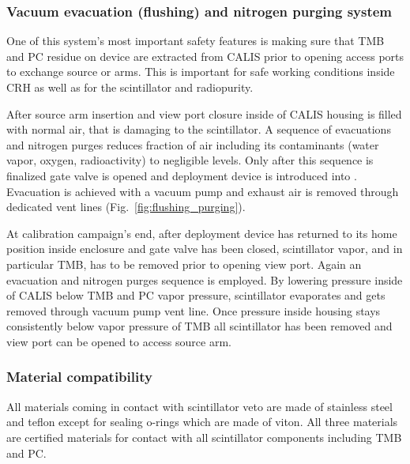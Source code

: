 \subsubsection*{Vacuum evacuation (flushing) and nitrogen purging system}\label{sec:EvacPurge}
One of this system's most important safety features is making sure that TMB and PC residue on device are extracted from CALIS prior to opening access ports to exchange source or arms. This is  important for safe working conditions inside CRH as well as for the scintillator and radiopurity. 

After source arm insertion and view port closure inside of CALIS housing is filled with normal air, that is damaging to the scintillator. A sequence of evacuations and nitrogen purges reduces fraction of air including its contaminants (water vapor, oxygen, radioactivity) to negligible levels. Only after this sequence is finalized gate valve is opened and deployment device is introduced into \lsv. Evacuation is achieved with a vacuum pump and exhaust air is removed through dedicated vent lines (Fig.~\ref{fig:flushing_purging}).

At calibration campaign's end, after deployment device has returned to its home position inside enclosure and gate valve has been closed, scintillator vapor, and in particular TMB, has to be removed prior to opening view port. Again an evacuation and nitrogen purges sequence is employed. By lowering pressure inside of CALIS below TMB and PC vapor pressure, scintillator evaporates and gets removed through vacuum pump vent line. Once pressure inside housing stays consistently below vapor pressure of TMB all scintillator has been removed and view port can be opened to access source arm.
 

\subsubsection*{Material compatibility}
All materials coming in contact with scintillator veto are made of stainless steel and teflon except for sealing o-rings which are made of viton.  All three materials are certified materials for contact with all scintillator components including TMB and PC.

